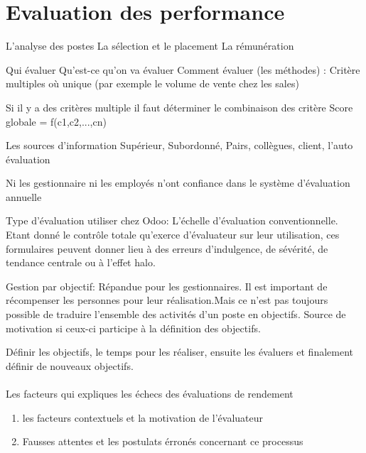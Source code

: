 \section{Evaluation des performance}
L'analyse des postes
La sélection et le placement 
La rémunération


Qui évaluer 
Qu'est-ce qu'on va évaluer
Comment évaluer (les méthodes) : Critère multiples où unique (par exemple le volume de vente chez les sales) 

Si il y a des critères multiple il faut déterminer le combinaison des critère
Score globale = f(c1,c2,...,cn)

Les sources d'information
Supérieur, Subordonné, Pairs, collègues, client, l'auto évaluation 

Ni les gestionnaire ni les employés n'ont confiance dans le système d'évaluation annuelle

Type d'évaluation utiliser chez Odoo: L'échelle d'évaluation conventionnelle.
Etant donné le contrôle totale qu'exerce d'évaluateur sur leur utilisation, ces formulaires peuvent donner lieu à des erreurs
d'indulgence, de sévérité, de tendance centrale ou à l'effet halo. 


Gestion par objectif: Répandue pour les gestionnaires. Il est important de récompenser les personnes pour leur réalisation.Mais ce n'est pas toujours possible de traduire l'ensemble des activités d'un poste en objectifs. 
Source de motivation si ceux-ci participe à la définition des objectifs. 

Définir les objectifs, le temps pour les réaliser, ensuite les évaluers et finalement définir de nouveaux objectifs. 


\paragraph{}{Les facteurs qui expliques les échecs des évaluations de rendement}
\begin{enumerate}
    \item les facteurs contextuels et la motivation de l'évaluateur
    \item Fausses attentes et les postulats érronés concernant ce processus
\end{enumerate}

